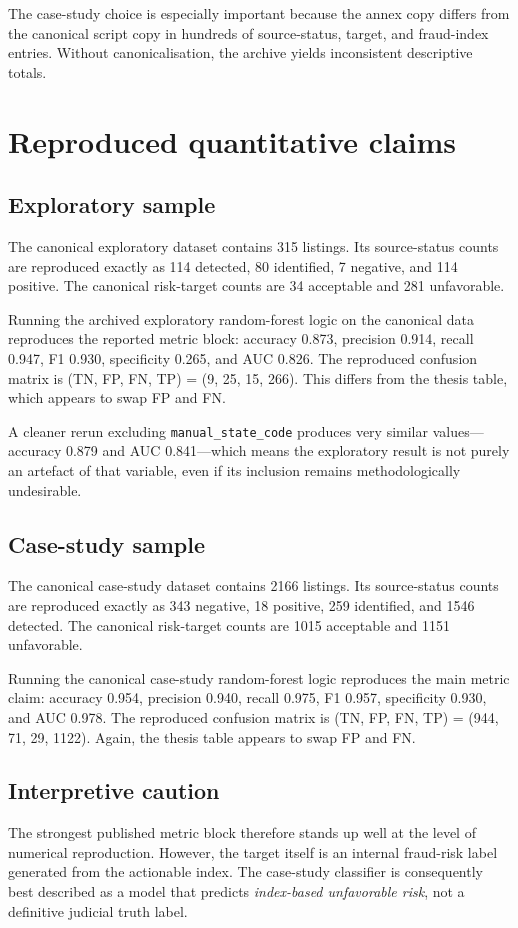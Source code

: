 \documentclass[11pt,a4paper]{article}
\begin{document}
The case-study choice is especially important because the annex copy differs from the canonical script copy in hundreds of source-status, target, and fraud-index entries. Without canonicalisation, the archive yields inconsistent descriptive totals.

\section{Reproduced quantitative claims}
\subsection{Exploratory sample}
The canonical exploratory dataset contains 315 listings. Its source-status counts are reproduced exactly as 114 detected, 80 identified, 7 negative, and 114 positive. The canonical risk-target counts are 34 acceptable and 281 unfavorable.

Running the archived exploratory random-forest logic on the canonical data reproduces the reported metric block: accuracy 0.873, precision 0.914, recall 0.947, F1 0.930, specificity 0.265, and AUC 0.826. The reproduced confusion matrix is (TN, FP, FN, TP) = (9, 25, 15, 266). This differs from the thesis table, which appears to swap FP and FN.

A cleaner rerun excluding \texttt{manual\_state\_code} produces very similar values---accuracy 0.879 and AUC 0.841---which means the exploratory result is not purely an artefact of that variable, even if its inclusion remains methodologically undesirable.

\subsection{Case-study sample}
The canonical case-study dataset contains 2166 listings. Its source-status counts are reproduced exactly as 343 negative, 18 positive, 259 identified, and 1546 detected. The canonical risk-target counts are 1015 acceptable and 1151 unfavorable.

Running the canonical case-study random-forest logic reproduces the main metric claim: accuracy 0.954, precision 0.940, recall 0.975, F1 0.957, specificity 0.930, and AUC 0.978. The reproduced confusion matrix is (TN, FP, FN, TP) = (944, 71, 29, 1122). Again, the thesis table appears to swap FP and FN.

\subsection{Interpretive caution}
The strongest published metric block therefore stands up well at the level of numerical reproduction. However, the target itself is an internal fraud-risk label generated from the actionable index. The case-study classifier is consequently best described as a model that predicts \emph{index-based unfavorable risk}, not a definitive judicial truth label.
\end{document}
